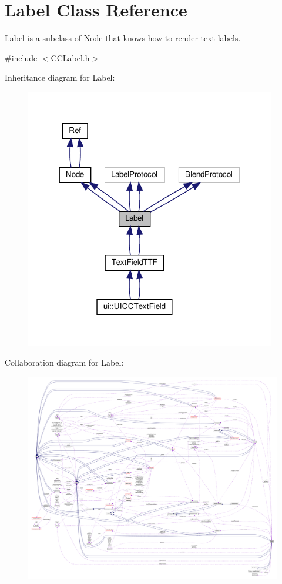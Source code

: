 \hypertarget{classLabel}{}\section{Label Class Reference}
\label{classLabel}


\hyperlink{classLabel}{Label} is a subclass of \hyperlink{classNode}{Node} that knows how to render text labels.  




{\ttfamily \#include $<$C\+C\+Label.\+h$>$}



Inheritance diagram for Label\+:
\nopagebreak
\begin{figure}[H]
\begin{center}
\leavevmode
\includegraphics[width=310pt]{classLabel__inherit__graph}
\end{center}
\end{figure}


Collaboration diagram for Label\+:
\nopagebreak
\begin{figure}[H]
\begin{center}
\leavevmode
\includegraphics[width=350pt]{classLabel__coll__graph}
\end{center}
\end{figure}
